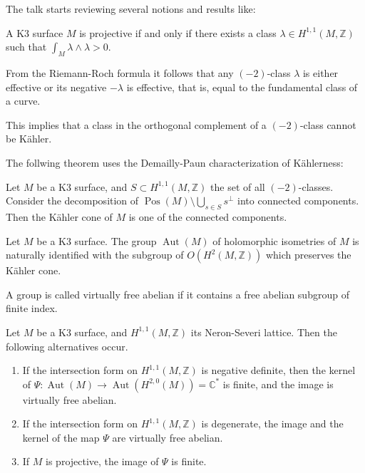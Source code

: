 \medskip\noindent
The talk starts reviewing several notions
and results like:

\begin{theorem}
A K3 surface $M$ is projective if and only if
there exists a class $\lambda \in H^{1,1}(M,\mathbb{Z})$
such that $\int_M \lambda \wedge \lambda > 0$.
\end{theorem}

\begin{remark}
From the Riemann-Roch formula it follows that
any $(-2)$-class $\lambda$ is either effective or
its negative $-\lambda$ is effective, that is,
equal to the fundamental class of a curve.
\end{remark}

\begin{remark}
This implies that a class in the orthogonal
complement of a $(-2)$-class cannot be Kähler.
\end{remark}

\noindent
The follwing theorem uses the Demailly-Paun
characterization of Kählerness:

\begin{theorem}
Let $M$ be a K3 surface, and $S \subset
H^{1,1}(M,\mathbb{Z})$ the set of all
$(-2)$-classes. Consider the decomposition of
$\operatorname{Pos}(M) \setminus
\bigcup_{s\in S} s^\perp$ into connected
components. Then the Kähler cone of $M$ is one
of the connected components.
\end{theorem}

\begin{theorem}
Let $M$ be a K3 surface. The group
$\operatorname{Aut}(M)$ of holomorphic
isometries of $M$ is naturally identified with
the subgroup of $O(H^2(M,\mathbb{Z}))$ which
preserves the Kähler cone.
\end{theorem}

\begin{definition}
A group is called virtually free abelian if it
contains a free abelian subgroup of finite
index.
\end{definition}

\begin{proposition}[Oguiso]
Let $M$ be a K3 surface, and $H^{1,1}(M,\mathbb{Z})$
its Neron-Severi lattice. Then the following
alternatives occur.
\begin{enumerate}
\item[(a)] If the intersection form on
$H^{1,1}(M,\mathbb{Z})$ is negative definite, then
the kernel of $\Psi: \operatorname{Aut}(M)\to
\operatorname{Aut}(H^{2,0}(M))=\mathbb{C}^*$ is finite,
and the image is virtually free abelian.
\item[(b)] If the intersection form on
$H^{1,1}(M,\mathbb{Z})$ is degenerate, the image and
the kernel of the map $\Psi$ are virtually free
abelian.
\item[(c)] If $M$ is projective, the image of $\Psi$
is finite.
\end{enumerate}
\end{proposition}

